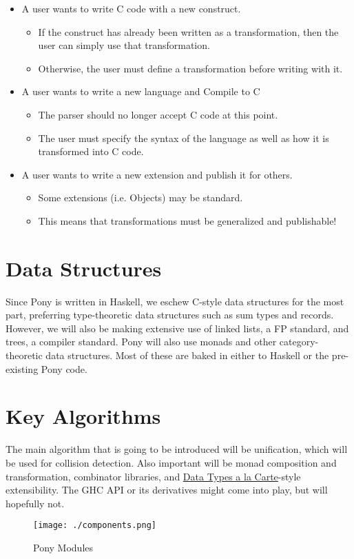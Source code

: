 \documentclass[11pt]{article}
\begin{document}
\begin{itemize}
\item A user wants to write C code with a new construct.
\begin{itemize}
\item If the construct has already been written as a transformation, then the user can simply use that transformation.
\item Otherwise, the user must define a transformation before writing with it.
\end{itemize}
\item A user wants to write a new language and Compile to C
\begin{itemize}
\item The parser should no longer accept C code at this point.
\item The user must specify the syntax of the language as well as how it is transformed into C code.
\end{itemize}
\item A user wants to write a new extension and publish it for others.
\begin{itemize}
\item Some extensions (i.e. Objects) may be standard.
\item This means that transformations must be generalized and publishable!
\end{itemize}
\end{itemize}
\section{Data Structures}
\label{sec-5}

Since Pony is written in Haskell, we eschew C-style data structures for the most part, preferring type-theoretic data structures such as sum types and records. However, we will also be making extensive use of linked lists, a FP standard, and trees, a compiler standard. Pony will also use monads and other category-theoretic data structures. Most of these are baked in either to Haskell or the pre-existing Pony code.
\section{Key Algorithms}
\label{sec-6}

The main algorithm that is going to be introduced will be unification, which will be used for collision detection. Also important will be monad composition and transformation, combinator libraries, and \underline{Data Types a la Carte}-style extensibility. The GHC API or its derivatives might come into play, but will hopefully not.



\begin{figure}[htb]
\centering
\texttt{[image: ./components.png]}
\caption{\label{fig:modules}Pony Modules}
\end{figure}
\end{document}

